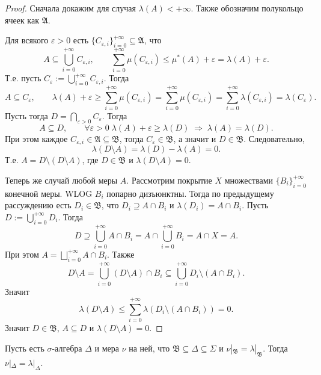 \documentclass[12pt,a4paper]{article}
\begin{document}
    \begin{proof}
        Сначала докажим для случая $\lambda(A) < +\infty$. Также обозначим полукольцо ячеек как $\mathfrak{A}$.

        Для всякого $\varepsilon > 0$ есть $\{C_{\varepsilon, i}\}_{i=0}^{+\infty} \subseteq \mathfrak{A}$, что
        \[
            A \subseteq \bigcup_{i=0}^{+\infty} C_{\varepsilon, i},
            \qquad
            \sum_{i=0}^{+\infty} \mu(C_{\varepsilon, i}) \leqslant \mu^*(A) + \varepsilon = \lambda(A) + \varepsilon.
        \]
        Т.е. пусть $C_\varepsilon := \bigcup_{i=0}^{+\infty} C_{\varepsilon, i}$. Тогда
        \[
            A \subseteq C_{\varepsilon},
            \qquad
            \lambda(A) + \varepsilon
            \geqslant \sum_{i=0}^{+\infty} \mu(C_{\varepsilon, i})
            = \sum_{i=0}^{+\infty} \mu(C_{\varepsilon, i})
            = \sum_{i=0}^{+\infty} \lambda(C_{\varepsilon, i})
            = \lambda(C_\varepsilon).
        \]
        Пусть тогда $D = \bigcap_{\varepsilon > 0} C_\varepsilon$. Тогда
        \[A \subseteq D, \qquad \forall \varepsilon > 0\; \lambda(A) + \varepsilon \geqslant \lambda(D) \; \Longrightarrow \; \lambda(A) = \lambda(D).\]
        При этом каждое $C_{\varepsilon, i} \in \mathfrak{A} \subseteq \mathfrak{B}$, тогда $C_\varepsilon \in \mathfrak{B}$, а значит и $D \in \mathfrak{B}$. Следовательно,
        \[\lambda(D \setminus A) = \lambda(D) - \lambda(A) = 0.\]
        Т.е. $A = D \setminus (D \setminus A)$, где $D \in \mathfrak{B}$ и $\lambda(D \setminus A) = 0$.

        Теперь же случай любой меры $A$. Рассмотрим покрытие $X$ множествами $\{B_i\}_{i=0}^{+\infty}$ конечной меры. WLOG $B_i$ попарно дизъюнктны. Тогда по предыдущему рассуждению есть $D_i \in \mathfrak{B}$, что $D_i \supseteq A \cap B_i$ и $\lambda(D_i) = A \cap B_i$. Пусть $D := \bigcup_{i=0}^{+\infty} D_i$. Тогда
        \[D \supseteq \bigcup_{i=0}^{+\infty} A \cap B_i = A \cap \bigcup_{i=0}^{+\infty} B_i = A \cap X = A.\]
        При этом $A = \bigsqcup_{i=0}^{+\infty} A \cap B_i$. Также
        \[D \setminus A = \bigcup_{i=0}^{+\infty} (D \setminus A) \cap B_i \subseteq \bigcup_{i=0}^{+\infty} D_i \setminus (A \cap B_i).\]
        Значит
        \[\lambda(D \setminus A) \leqslant \sum_{i=0}^{+\infty} \lambda(D_i \setminus (A \cap B_i)) = 0.\]
        Значит $D \in \mathfrak{B}$, $A \subseteq D$ и $\lambda(D \setminus A) = 0$.
    \end{proof}

    \begin{lemma}
        Пусть есть $\sigma$-алгебра $\Delta$ и мера $\nu$ на ней, что $\mathfrak{B} \subseteq \Delta \subseteq \Sigma$ и $\nu|_{\mathfrak{B}} = \lambda|_{\mathfrak{B}}$. Тогда $\nu|_\Delta = \lambda|_\Delta$.
    \end{lemma}
\end{document}
